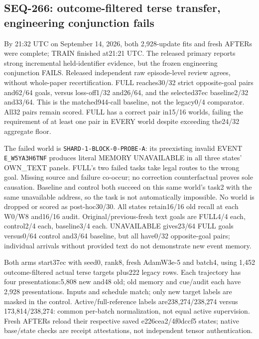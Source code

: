 \documentclass[11pt]{article}
\begin{document}
\subsection{SEQ-266: outcome-filtered terse transfer, engineering conjunction fails}
\label{sec:quality-breadth-fit}

By 21:32 UTC on September 14, 2026, both 2,928-update fits and fresh AFTERs
were complete; TRAIN finished at21:21 UTC. The released primary reports strong
incremental held-identifier evidence, but the frozen engineering conjunction
FAILS. Released independent raw episode-level review agrees, without whole-paper
recertification. FULL reaches30/32 strict opposite-goal pairs and62/64 goals,
versus loss-off1/32 and26/64, and the selected37ec baseline2/32 and33/64.
This is the matched944-call baseline, not the legacy0/4 comparator. All32 pairs
remain scored. FULL has a correct pair in15/16 worlds, failing the requirement
of at least one pair in EVERY world despite exceeding the24/32 aggregate floor.

The failed world is \texttt{SHARD-1-BLOCK-0-PROBE-A}: its preexisting invalid EVENT
\texttt{E\_W5YA3H6TNF} produces literal MEMORY UNAVAILABLE in all three states' OWN\_TEXT
panels. FULL's two failed tasks take legal routes to the wrong goal. Missing
source and failure co-occur; no correction counterfactual proves sole causation.
Baseline and control both succeed on this same world's task2 with the same
unavailable address, so the task is not automatically impossible. No world is
dropped or scored as post-hoc30/30. All states retain16/16 old
recall at each W0/W8 and16/16 audit. Original/previous-fresh text goals are
FULL4/4 each, control2/4 each, baseline3/4 each. UNAVAILABLE gives23/64 FULL
goals versus0/64 control and3/64 baseline, but all have0/32 opposite-goal pairs;
individual arrivals without provided text do not demonstrate new event memory.

Both arms start37ec with seed0, rank8, fresh AdamW3e-5 and batch4, using
1,452 outcome-filtered actual terse targets plus222 legacy rows. Each trajectory
has four presentations:5,808 new and48 old; old memory and cue/audit each have
2,928 presentations. Inputs and schedule match; only new target labels are
masked in the control. Active/full-reference labels are238,274/238,274 versus
173,814/238,274: common per-batch normalization, not equal active supervision.
Fresh AFTERs reload their respective saved e226cea2/4f0dccf5 states; native
base/state checks are receipt attestations, not independent tensor authentication.
\end{document}
